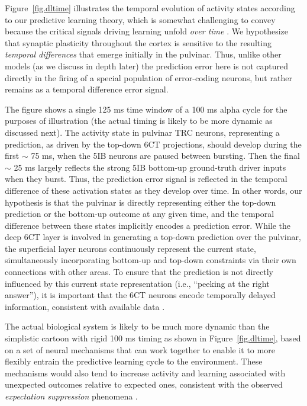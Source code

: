 \documentclass[11pt,twoside]{article}
\newif\myifpdf
\begin{document}
Figure~\ref{fig.dltime} illustrates the temporal evolution of activity states according to our predictive learning theory, which is somewhat challenging to convey because the critical signals driving learning unfold \emph{over time} \citep{KachergisWyatteOReillyEtAl14,OReillyWyatteRohrlich14,OReillyWyatteRohrlich17}.  We hypothesize that synaptic plasticity throughout the cortex is sensitive to the resulting \emph{temporal differences} that emerge initially in the pulvinar.  Thus, unlike other models (as we discuss in depth later) the prediction error here is not captured directly in the firing of a special population of error-coding neurons, but rather remains as a temporal difference error signal.

The figure shows a single 125 ms time window of a 100 ms alpha cycle for the purposes of illustration (the actual timing is likely to be more dynamic as discussed next).  The activity state in pulvinar TRC neurons, representing a prediction, as driven by the top-down 6CT projections, should develop during the first $\sim$ 75 ms, when the 5IB neurons are paused between bursting.  Then the final $\sim$ 25 ms largely reflects the strong 5IB bottom-up ground-truth driver inputs when they burst.  Thus, the prediction error signal is reflected in the temporal difference of these activation states as they develop over time.  In other words, our hypothesis is that the pulvinar is directly representing either the top-down prediction or the bottom-up outcome at any given time, and the temporal difference between these states implicitly encodes a prediction error.  While the deep 6CT layer is involved in generating a top-down prediction over the pulvinar, the superficial layer neurons continuously represent the current state, simultaneously incorporating bottom-up and top-down constraints via their own connections with other areas.  To ensure that the prediction is not directly influenced by this current state representation (i.e., ``peeking at the right answer''), it is important that the 6CT neurons encode temporally delayed information, consistent with available data \citep{HarrisShepherd15,SakataHarris09,Thomson10}.

The actual biological system is likely to be much more dynamic than the simplistic cartoon with rigid 100 ms timing as shown in Figure~\ref{fig.dltime}, based on a set of neural mechanisms that can work together to enable it to more flexibly entrain the predictive learning cycle to the environment.  These mechanisms would also tend to increase activity and learning associated with unexpected outcomes relative to expected ones, consistent with the observed \emph{expectation suppression} phenomena \citep{SummerfieldTrittschuhMontiEtAl08,TodorovicEdeMarisEtAl11,MeyerOlson11,BastosUsreyAdamsEtAl12}.
\end{document}
